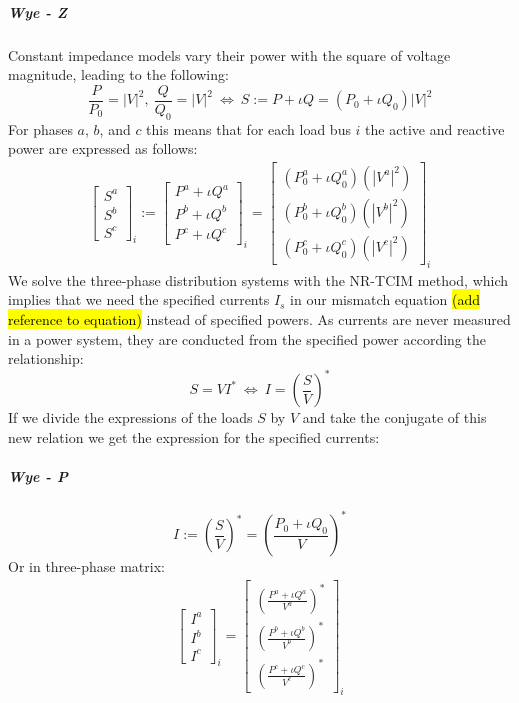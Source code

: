 \documentclass[10pt,journal]{article}
\begin{document}
\subparagraph{Wye - Z}
Constant impedance models vary their power with the square of voltage magnitude, leading to the following: 
\begin{equation}
    \frac{P}{P_0}=|V|^2,\ \frac{Q}{Q_0}=|V|^2\ \Leftrightarrow\ S := P +\iota Q = (P_0 + \iota Q_0)|V|^2
\end{equation}
For phases $a$, $b$, and $c$ this means that for each load bus $i$ the active and reactive power are expressed as follows: 
\begin{align}
    \begin{bmatrix}
    S^a\\
    S^b\\
    S^c
    \end{bmatrix}_i := \begin{bmatrix}
    P^a +\iota Q^a\\
    P^b +\iota Q^b\\
    P^c +\iota Q^c
    \end{bmatrix}_i = \begin{bmatrix}
    (P^a_0 +\iota Q^a_0)(|V^a|^2)\\
    (P^b_0 +\iota Q^b_0)(|V^b|^2)\\
    (P^c_0 +\iota Q^c_0)(|V^c|^2)
    \end{bmatrix}_i 
\end{align}
We solve the three-phase distribution systems with the NR-TCIM method, which implies that we need the specified currents $I_s$ in our mismatch equation \hl{(add reference to equation)} instead of specified powers. As currents are never measured in a power system, they are conducted from the specified power according the relationship: 
\begin{equation}
    S=VI^*\ \Leftrightarrow\ I = (\frac{S}{V})^*
\end{equation}
If we divide the expressions of the loads $S$ by $V$ and take the conjugate of this new relation we get the expression for the specified currents:
\subparagraph{Wye - P }
\begin{equation}
    I := (\frac{S}{V})^* = (\frac{P_0+\iota Q_0}{V})^*
\end{equation}
Or in three-phase matrix: 
\begin{align}
\begin{bmatrix}
    I^a\\
    I^b\\
    I^c
    \end{bmatrix}_i = \begin{bmatrix}
   (\frac{ P^a +\iota Q^a}{V^a})^*\\
    (\frac{ P^b +\iota Q^b}{V^b})^*\\
    (\frac{ P^c +\iota Q^c}{V^c})^*
    \end{bmatrix}_i 
    \end{align}
\end{document}
